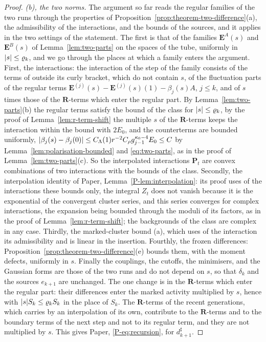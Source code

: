 \documentclass[11pt]{preprint}
\DeclarePairedDelimiter{\abs}{\lvert}{\rvert}
\numberwithin{equation}{section}
\theoremstyle{definition}
\theoremstyle{remark}
\theoremstyle{plain}
\begin{document}
\begin{proof}
\emph{(b), the two norms.} The argument so far reads the regular families of the two runs through the properties of Proposition~\ref{prop:theorem-two-difference}(a), the admissibility of the interactions, and the bounds of the sources, and it applies in the two settings of the statement. The first is that of the families $\mathbf E^A(s)$ and $\mathbf E^B(s)$ of Lemma~\ref{lem:two-parts} on the spaces of the tube, uniformly in $\abs s \leq \varrho_k$, and we go through the places at which a family enters the argument. First, the interactions: the interaction of the step of the family consists of the terms of \cite[(2.12)]{BalabanRG1} outside its curly bracket, which do not contain $s$, of the fluctuation parts of the regular terms $\mathbf E^{(j)}(s) - \mathbf E^{(j)}(s)(1) - \beta_j(s)A$, $j \leq k$, and of $s$ times those of the $\mathbf R$-terms which enter the regular part. By Lemma~\ref{lem:two-parts}(b) the regular terms satisfy the bound of the class for $\abs s \leq \varrho_k$, by the proof of Lemma~\ref{lem:r-term-shift} the multiple $s$ of the $\mathbf R$-terms keeps the interaction within the bound with $2E_0$, and the counterterms are bounded uniformly, $\abs{\beta_j(s) - \beta_j(0)} \leq C_\Lambda(1)r^{-2}C_\rho g_{j-1}^{\kappa_0-4}E_0 \leq C$ by Lemma~\ref{lem:polarisation-bounded} and \eqref{eq:two-parts}, as in the proof of Lemma~\ref{lem:two-parts}(c). So the interpolated interactions $\mathbf P_t$ are convex combinations of two interactions with the bounds of the class. Secondly, the interpolation identity of Paper, Lemma~\ref{P-lem:interpolation}: its proof uses of the interactions these bounds only, the integral $Z_t$ does not vanish because it is the exponential of the convergent cluster series, and this series converges for complex interactions, the expansion \cite[(2.14), p.~15]{BalabanRG2} being bounded through the moduli of its factors, as in the proof of Lemma~\ref{lem:r-term-shift}; the backgrounds of the class are complex in any case. Thirdly, the marked-cluster bound (a), which uses of the interaction its admissibility and is linear in the insertion. Fourthly, the frozen differences: Proposition~\ref{prop:theorem-two-difference}(e) bounds them, with the moment defects, uniformly in $s$. Finally the couplings, the cutoffs, the minimisers, and the Gaussian forms are those of the two runs and do not depend on $s$, so that $\delta_k$ and the sources $e_{k+1}$ are unchanged. The one change is in the $\mathbf R$-terms which enter the regular part: their differences enter the marked activity multiplied by $s$, hence with $\abs sS_k \leq \varrho_kS_k$ in the place of $S_k$. The $\mathbf R$-terms of the recent generations, which \cite[(3.26), p.~271]{BalabanCRE} carries by an interpolation of its own, contribute to the $\mathbf R$-terms and to the boundary terms of the next step and not to its regular term, and they are not multiplied by $s$. This gives Paper, \eqref{P-eq:recursion}, for $d^\sharp_{k+1}$.


\end{proof}
\end{document}
